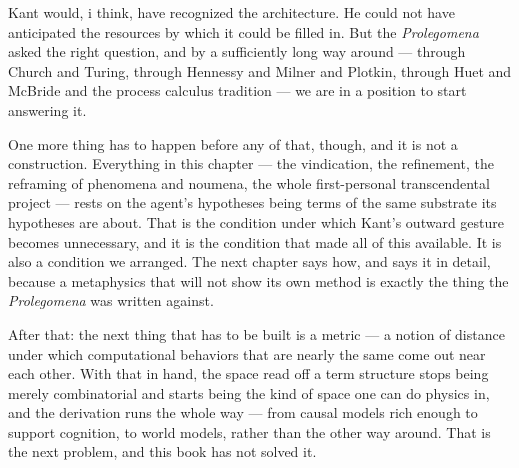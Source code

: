 Kant would, i think, have recognized the architecture.
He could not have anticipated the resources by which it could be
filled in.
But the \emph{Prolegomena} asked the right question, and by a
sufficiently long way around --- through Church and Turing, through
Hennessy and Milner and Plotkin, through Huet and McBride and the
process calculus tradition --- we are in a position to start
answering it.

One more thing has to happen before any of that, though, and it is
not a construction.
Everything in this chapter --- the vindication, the refinement, the
reframing of phenomena and noumena, the whole first-personal
transcendental project --- rests on the agent's hypotheses being
terms of the same substrate its hypotheses are about.
That is the condition under which Kant's outward gesture becomes
unnecessary, and it is the condition that made all of this
available.
It is also a condition we arranged.
The next chapter says how, and says it in detail, because a
metaphysics that will not show its own method is exactly the thing
the \emph{Prolegomena} was written against.

After that:
the next thing that has to be built is a metric --- a notion of
distance under which computational behaviors that are nearly the
same come out near each other.
With that in hand, the space read off a term structure stops being
merely combinatorial and starts being the kind of space one can do
physics in, and the derivation runs the whole way --- from causal
models rich enough to support cognition, to world models, rather
than the other way around.
That is the next problem, and this book has not solved it.
